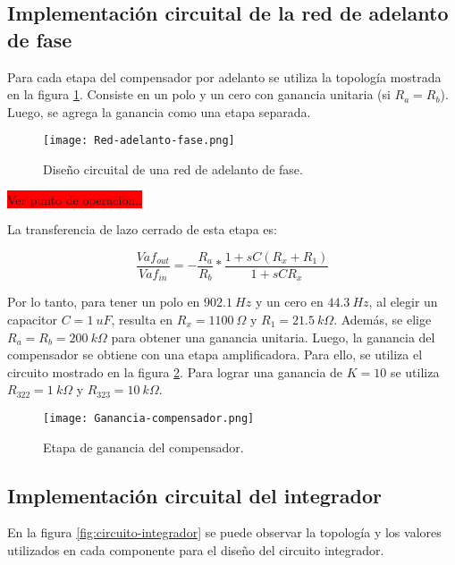 \subsection{Implementación circuital de la red de adelanto de fase}

\noindent Para cada etapa del compensador por adelanto se utiliza la topología mostrada en la figura \ref{fig:red-adelanto-fase}. Consiste en  un polo y un cero con ganancia unitaria (si $R_a = R_b$). Luego, se agrega la ganancia como una etapa separada.

\begin{figure}[H]
	\centering
	\texttt{[image: Red-adelanto-fase.png]}
	\caption{Diseño circuital de una red de adelanto de fase.}
	\label{fig:red-adelanto-fase}
\end{figure}

\colorbox{red}{Ver punto de operacion..}

\noindent La transferencia de lazo cerrado de esta etapa es:

\begin{equation} 
	\frac{Vaf_{out}}{Vaf_{in}}= - \frac{R_a}{R_b}*\frac{1+sC(R_x+R_1)}{1+sCR_x}
\end{equation}

\noindent Por lo tanto, para tener un polo en $902.1\:Hz$ y un cero en $44.3\:Hz$, al elegir un capacitor $C = 1\:uF$, resulta en $R_x = 1100\:\Omega$ y $R_1 = 21.5\:k\Omega$. Además, se elige $R_a = R_b = 200\:k\Omega$ para obtener una ganancia unitaria. Luego, la ganancia del compensador se obtiene con una etapa amplificadora.
Para ello, se utiliza el circuito mostrado en la figura \ref{fig:ganancia-compensador}. Para lograr una ganancia de $K=10$ se utiliza $R_{322} = 1\:k\Omega$ y $R_{323} = 10\:k\Omega$.


\begin{figure}[H]
	\centering
	\texttt{[image: Ganancia-compensador.png]}
	\caption{Etapa de ganancia del compensador.}
	\label{fig:ganancia-compensador}
\end{figure}

\subsection{Implementación circuital del integrador}

\noindent En la figura \ref{fig:circuito-integrador} se puede observar la topología y los valores utilizados en cada componente para el diseño del circuito integrador.

